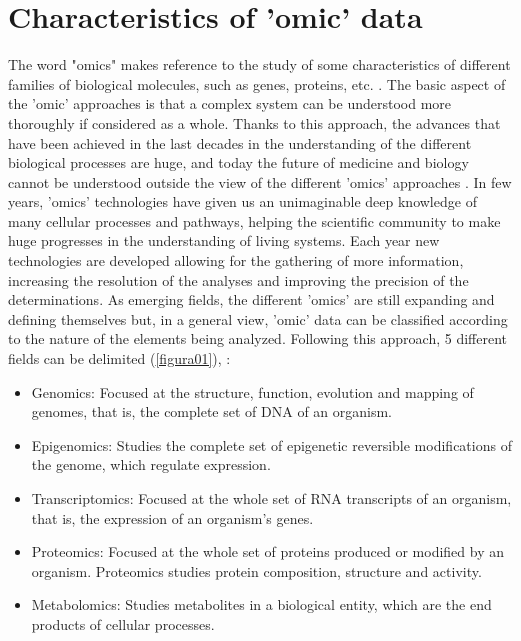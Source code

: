 \section{Characteristics of 'omic' data}
\label{sec:charomicdata}
The word "omics" makes reference to the study of some characteristics of different families of biological molecules, such as genes, proteins, etc. \parencite{palsson2002silico}. The basic aspect of the 'omic' approaches is that a complex system can be understood more thoroughly if considered as a whole. Thanks to this approach, the advances that have been achieved in the last decades in the understanding of the different biological processes are huge, and today the future of medicine and biology cannot be understood outside the view of the different 'omics' approaches \parencite{van2018role}. In few years, 'omics' technologies have given us an unimaginable deep knowledge of many cellular processes and pathways, helping the scientific community to make huge progresses in the understanding of living systems. Each year new technologies are developed allowing for the gathering of more information, increasing the resolution of the analyses and improving the precision of the determinations. As emerging fields, the different 'omics' are still expanding and defining themselves but, in a general view, 'omic' data can be classified according to the nature of the elements being analyzed. Following this approach, 5 different fields can be delimited (\autoref{figura01}), \parencite{horgan2011omic, 2018iv}:

\vspace{10pt}

\begin{itemize}
    \item Genomics: Focused at the structure, function, evolution and mapping of genomes, that is, the complete set of DNA of an organism.
    \item Epigenomics: Studies the complete set of epigenetic reversible modifications of the genome, which regulate expression.
    \item Transcriptomics: Focused at the whole set of RNA transcripts of an organism, that is, the expression of an organism's genes.
    \item Proteomics: Focused at the whole set of proteins produced or modified by an organism. Proteomics studies protein composition, structure and activity.
    \item Metabolomics: Studies metabolites in a biological entity, which are the end products of cellular processes.
\end{itemize}

